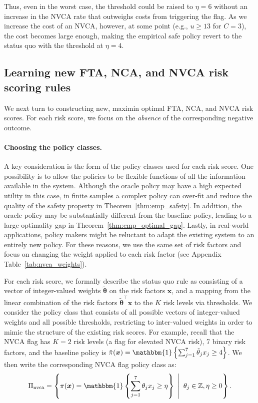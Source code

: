 \documentclass[12pt]{article}
\theoremstyle{definition}
\newcommand{\Z}{\ensuremath{\mathbb{Z}}}
\newcommand{\bbone}{\ensuremath{\mathbbm{1}}}
\newcommand{\bx}{\bm x}
\newcommand{\<}{\langle}
\renewcommand{\>}{\rangle}
\begin{document}
Thus, even in the worst case, the threshold could be raised to
$\eta = 6$ without an increase in the NVCA rate that outweighs costs
from triggering the flag.  As we increase the cost of an NVCA,
however, at some point (e.g., $u \geq 13$ for $C = 3$), the cost
becomes large enough, making the empirical safe policy revert to the
status quo with the threshold at $\eta = 4$.

\subsection{Learning new FTA, NCA, and NVCA risk scoring rules}
\label{sec:risk_scores}

We next turn to constructing new, maximin optimal FTA, NCA, and NVCA
risk scores. For each risk score, we focus on the \emph{absence} of
the corresponding negative outcome.

\paragraph{Choosing the policy classes.}
A key consideration is the form of the policy classes used for each
risk score.  One possibility is to allow the policies to be flexible
functions of all the information available in the system.
Although the oracle policy may have a high expected utility in
this case, in finite samples a complex policy can over-fit and
reduce the quality of the safety property in
Theorem~\ref{thm:emp_safety}.  In addition, the oracle policy may be
substantially different from the baseline policy, leading to a large
optimality gap in Theorem~\ref{thm:emp_optimal_gap}.  Lastly, in
real-world applications, policy makers might be reluctant to adapt
the existing system to an entirely new policy. For these reasons,
we use the same set of risk factors and focus on changing the weight
applied to each risk factor (see Appendix Table~\ref{tab:nvca_weights}).


For each risk score, we formally describe the status quo rule as
consisting of a vector of integer-valued weights $\tilde{\boldsymbol\theta}$ on
the risk factors $\bx$, and a mapping from the linear combination of the
risk factors $\tilde{\boldsymbol\theta}^\top \bx$ to the $K$ risk levels via
thresholds.
We consider the policy class that consists of all
possible vectors of integer-valued weights and all possible
thresholds, restricting to inter-valued weights in order to mimic the structure
of the existing risk scores.
For example, recall that the NVCA flag has $K=2$ risk
levels (a flag for elevated NVCA risk), 7 binary risk factors, and the
baseline policy is
$\tilde{\pi}(\bx) = \bbone\left\{\sum_{j=1}^7 \tilde{\theta}_j x_j \geq
  4\right\}$.
We then write the corresponding NVCA flag policy class
as:
\begin{equation}
  \label{eq:integer_weight_policy}
  \Pi_{\text{nvca}} = \left\{\pi(\bx) = \bbone\left\{\sum_{j=1}^7 \theta_j x_j \geq \eta \right\} \; \left \vert  \vphantom{\sum_{j=1}^7 }\right. \; \theta_j \in \Z, \eta \geq 0 \right\}.
\end{equation}
\end{document}

